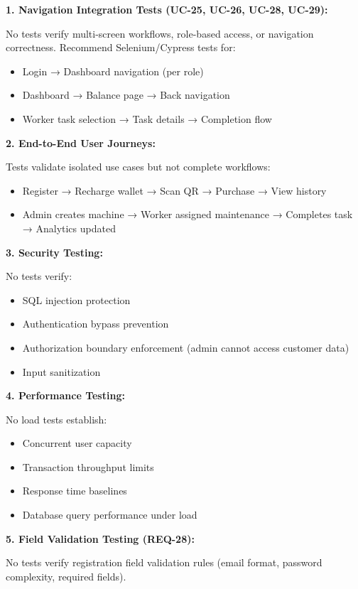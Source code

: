 \documentclass[11pt,a4paper]{article}
\begin{document}
\begin{tcolorbox}[colback=warningorange!5,colframe=warningorange,title=\textbf{Missing Test Categories}]
\textbf{1. Navigation Integration Tests (UC-25, UC-26, UC-28, UC-29):}

No tests verify multi-screen workflows, role-based access, or navigation correctness. Recommend Selenium/Cypress tests for:
\begin{itemize}
    \item Login → Dashboard navigation (per role)
    \item Dashboard → Balance page → Back navigation
    \item Worker task selection → Task details → Completion flow
\end{itemize}

\textbf{2. End-to-End User Journeys:}

Tests validate isolated use cases but not complete workflows:
\begin{itemize}
    \item Register → Recharge wallet → Scan QR → Purchase → View history
    \item Admin creates machine → Worker assigned maintenance → Completes task → Analytics updated
\end{itemize}

\textbf{3. Security Testing:}

No tests verify:
\begin{itemize}
    \item SQL injection protection
    \item Authentication bypass prevention
    \item Authorization boundary enforcement (admin cannot access customer data)
    \item Input sanitization
\end{itemize}

\textbf{4. Performance Testing:}

No load tests establish:
\begin{itemize}
    \item Concurrent user capacity
    \item Transaction throughput limits
    \item Response time baselines
    \item Database query performance under load
\end{itemize}

\textbf{5. Field Validation Testing (REQ-28):}

No tests verify registration field validation rules (email format, password complexity, required fields).
\end{tcolorbox}
\end{document}
